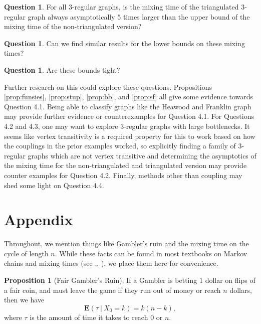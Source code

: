 \documentclass[10pt,a4paper]{amsart}
\theoremstyle{definition}
\numberwithin{definition}{section}
\newtheorem{question}[definition]{Question}
\newtheorem{proposition}[definition]{Proposition}
\begin{document}
\begin{question}
For all $3$-regular graphs, is the mixing time of the triangulated $3$-regular graph always asymptotically $5$ times larger than the upper bound of the mixing time of the non-triangulated version?
\end{question}

\begin{question}
Can we find similar results for the lower bounds on these mixing times?
\end{question}

\begin{question}
Are these bounds tight?
\end{question}


Further research on this could explore these questions. Propositions \ref{prop:funsies}, \ref{prop:stup}, \ref{prop:bb}, and \ref{prop:sf} all give some evidence towards Question 4.1. Being able to classify graphs like the Heawood and Franklin graph may provide further evidence or counterexamples for Question 4.1. For Questions 4.2 and 4.3, one may want to explore $3$-regular graphs with large bottlenecks. It seems like vertex transitivity is a required property for this to work based on how the couplings in the prior examples worked, so explicitly finding a family of $3$-regular graphs which are not vertex transitive and determining the asymptotics of the mixing time for the non-triangulated and triangulated version may provide counter examples for Question 4.2. Finally, methods other than coupling may shed some light on Question 4.4.

\section{Appendix}\label{appendix}

Throughout, we mention things like Gambler's ruin and the mixing time on the cycle of length $n$. While these facts can be found in most textbooks on Markov chains and mixing times (see \cite{durrett1999essentials},\cite{LevinPeresWilmer2006}, \cite{resnick2013adventures}), we place them here for convenience.

\begin{proposition}[Fair Gambler's Ruin] \label{prop:gambleruin}
If a Gambler is betting $1$ dollar on flips of a fair coin, and must leave the game if they run out of money or reach $n$ dollars, then we have 
\[\mathbf{E}(\tau \ | \ X_0 = k) = k(n-k), \]
where $\tau$ is the amount of time it takes to reach $0$ or $n$.
\end{proposition}
\end{document}
